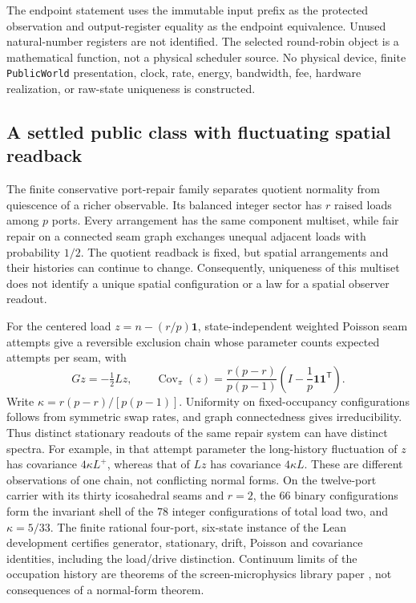 \documentclass[11pt]{article}
\theoremstyle{definition}
\theoremstyle{remark}
\numberwithin{equation}{section}
\begin{document}
The endpoint statement uses the immutable input prefix as the protected
observation and output-register equality as the endpoint equivalence.  Unused
natural-number registers are not identified.  The selected round-robin object
is a mathematical function, not a physical scheduler source.  No physical
device, finite \texttt{PublicWorld} presentation, clock, rate, energy,
bandwidth, fee, hardware realization, or raw-state uniqueness is constructed.

\subsection{A settled public class with fluctuating spatial readback}
\label{subsec:settled-public-class}
The finite conservative port-repair family separates quotient normality
from quiescence of a richer observable. Its balanced integer sector has
\(r\) raised loads among \(p\) ports. Every arrangement has the same
component multiset, while fair repair on a connected seam graph exchanges
unequal adjacent loads with probability \(1/2\). The quotient readback is
fixed, but spatial arrangements and their histories can continue
to change. Consequently, uniqueness of this multiset does not identify a
unique spatial configuration or a law for a spatial observer readout.

For the centered load \(z=n-(r/p)\mathbf1\), state-independent weighted
Poisson seam attempts give a reversible exclusion chain whose parameter
counts expected attempts per seam, with
\[
 Gz=-\tfrac12Lz,\qquad
 \operatorname{Cov}_\pi(z)=\frac{r(p-r)}{p(p-1)}
       \left(I-\frac1p\mathbf1\mathbf1^{\mathsf T}\right).
\]
Write \(\kappa=r(p-r)/[p(p-1)]\).
Uniformity on fixed-occupancy configurations follows from symmetric swap
rates, and graph connectedness gives irreducibility. Thus distinct
stationary readouts of the same repair system can have distinct spectra.
For example, in that attempt parameter the long-history fluctuation of
\(z\) has covariance \(4\kappa L^+\), whereas that of \(Lz\) has
covariance \(4\kappa L\).
These are different observations of one chain, not conflicting normal
forms. On the twelve-port carrier with its thirty icosahedral seams and
\(r=2\), the \(66\) binary configurations form the invariant shell of the
\(78\) integer configurations of total load two, and \(\kappa=5/33\).
The finite rational four-port, six-state instance of the Lean development
\citep{ophfourcycle} certifies generator,
stationary, drift, Poisson and covariance identities, including the
load/drive distinction. Continuum limits of the occupation history are
theorems of the screen-microphysics library paper \citep{ophMicrophysics},
not consequences of a normal-form theorem.
\end{document}
